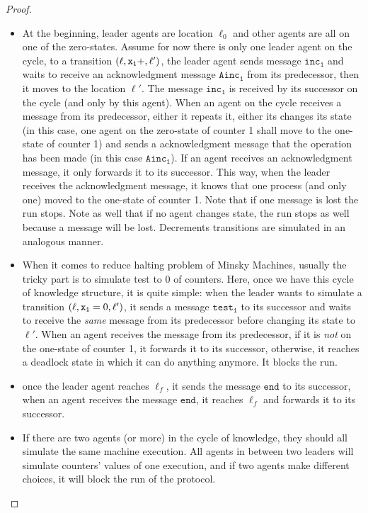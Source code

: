 \begin{proof}
\begin{itemize}
		\item At the beginning, leader agents are location $\ell_0$ and other agents are all on one of the zero-states. Assume for now there is only one leader agent on the cycle, to a transition $(\ell, \mathtt{\mathtt{x}_1}+, \ell')$, the leader agent sends message $\mathtt{inc_1}$ and waits to receive an acknowledgment message $\mathtt{Ainc_1}$ from its predecessor, then it moves to the location $\ell'$. The message $\mathtt{inc_1}$ is received by its successor on the cycle (and only by this agent). When an agent on the cycle receives a message from its predecessor, either it repeats it, either its changes its state (in this case, one agent on the zero-state of counter 1 shall move to the one-state of counter 1) and sends a acknowledgment message that the operation has been made (in this case $\mathtt{Ainc_1}$). If an agent receives an acknowledgment message, it only forwards it to its successor. This way, when the leader receives the acknowledgment message, it knows that one process (and only one) moved to the one-state of counter 1. Note that if one message is lost the run stops. Note as well that if no agent changes state, the run stops as well because a message will be lost. Decrements transitions are simulated in an analogous manner.
		
		\item When it comes to reduce halting problem of Minsky Machines, usually the tricky part is to simulate test to 0 of counters. Here, once we have this cycle of knowledge structure, it is quite simple: when the leader wants to simulate a transition $(\ell, \mathtt{\mathtt{x}_1}=0, \ell')$, it sends a message $\mathtt{test_1}$ to its successor and waits to receive the \emph{same} message from its predecessor before changing its state to $\ell'$. When an agent receives the message from its predecessor, if it is \emph{not} on the one-state of counter 1, it forwards it to its successor, otherwise, it reaches a deadlock state in which it can do anything anymore. It blocks the run.
		
		\item once the leader agent reaches $\ell_f$, it sends the message $\mathtt{end}$ to its successor, when an agent receives the message $\mathtt{end}$, it reaches $\ell_f$ and forwards it to its successor.
		
		\item If there are two agents (or more) in the cycle of knowledge, they should all simulate the same machine execution. All agents in between two leaders will simulate counters' values of one execution, and if two agents make different choices, it will block the run of the protocol. 
	\end{itemize}
\end{proof}
\fi

